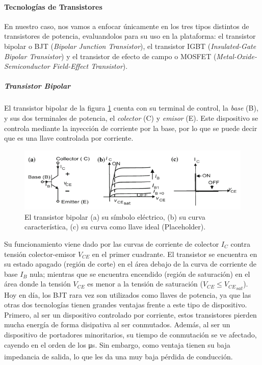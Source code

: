 \paragraph{Tecnologías de Transistores}

En nuestro caso, nos vamos a enfocar únicamente en los tres tipos distintos de transistores de potencia, evaluandolos para su uso en la plataforma: el transistor bipolar o BJT (\textit{Bipolar Junction Transistor}), el transistor IGBT (\textit{Insulated-Gate Bipolar Transistor}) y el transistor de efecto de campo o MOSFET (\textit{Metal-Oxide-Semiconductor Field-Effect Transistor}).\\

\subparagraph{Transistor Bipolar}

El transistor bipolar de la figura \ref{bjt} cuenta con su terminal de control, la \textit{base} (B), y sus dos terminales de potencia, el \textit{colector} (C) y \textit{emisor} (E). Este dispositivo se controla mediante la inyección de corriente por la base, por lo que se puede decir que es una llave controlada por corriente.\\

\begin{figure}[h]
    \centering
    \includegraphics[scale=0.6]{Imagenes/BJT.png}
    \caption{El transistor bipolar (a) su símbolo eléctrico, (b) su curva característica, (c) su curva como llave ideal (Placeholder).}
    \label{bjt}
\end{figure}

Su funcionamiento viene dado por las curvas de corriente de colector $I_C$ contra tensión colector-emisor $V_{CE}$ en el primer cuadrante. El transistor se encuentra en su estado apagado (región de corte) en el área debajo de la curva de corriente de base $I_B$ nula; mientras que se encuentra encendido (región de saturación) en el área donde la tensión $V_{CE}$ es menor a la tensión de saturación ($V_{CE} \leq {V_{CE}}_{sat}$).\\

Hoy en día, los BJT rara vez son utilizados como llaves de potencia, ya que las otras dos tecnologías tienen grandes ventajas frente a este tipo de dispositivo. Primero, al ser un dispositivo controlado por corriente, estos transistores pierden mucha energía de forma disipativa al ser conmutados. Además, al ser un dispositivo de portadores minoritarios, su tiempo de conmutación se ve afectado, cayendo en el orden de los \unit[]{\micro\second}. Sin embargo, como ventaja tienen su baja impedancia de salida, lo que les da una muy baja pérdida de conducción.\textsuperscript{\cite{PotenciaHart}\cite{PowerElecRenewableEnergySystems}}\\

